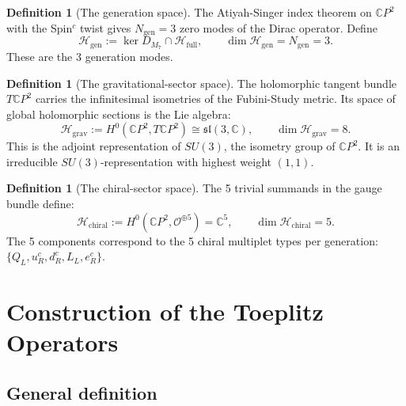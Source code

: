 \documentclass[11pt]{article}
\theoremstyle{definition}
\newtheorem{definition}[theorem]{Definition}
\theoremstyle{remark}
\newcommand{\CP}{\mathbb{C}P}
\begin{document}
\begin{definition}[The generation space]
\label{def:H-gen}
The Atiyah-Singer index theorem on $\CP^2$ with the Spin$^c$ twist
gives $N_{\mathrm{gen}} = 3$ zero modes of the Dirac operator. Define
\begin{equation}
\mathcal{H}_{\mathrm{gen}} := \ker D_{M_7} \cap \mathcal{H}_{\mathrm{full}},
\qquad \dim \mathcal{H}_{\mathrm{gen}} = N_{\mathrm{gen}} = 3.
\end{equation}
These are the 3 generation modes.
\end{definition}

\begin{definition}[The gravitational-sector space]
\label{def:H-grav}
The holomorphic tangent bundle $T\CP^2$ carries the infinitesimal
isometries of the Fubini-Study metric. Its space of global holomorphic
sections is the Lie algebra:
\begin{equation}
\mathcal{H}_{\mathrm{grav}} := H^0(\CP^2, T\CP^2) \cong \mathfrak{sl}(3,\mathbb{C}),
\qquad \dim \mathcal{H}_{\mathrm{grav}} = 8.
\end{equation}
This is the adjoint representation of $SU(3)$, the isometry group of
$\CP^2$. It is an irreducible $SU(3)$-representation with highest weight
$(1,1)$.
\end{definition}

\begin{definition}[The chiral-sector space]
\label{def:H-chiral}
The 5 trivial summands in the gauge bundle define:
\begin{equation}
\mathcal{H}_{\mathrm{chiral}} := H^0(\CP^2, \mathcal{O}^{\oplus 5}) = \mathbb{C}^5,
\qquad \dim \mathcal{H}_{\mathrm{chiral}} = 5.
\end{equation}
The 5 components correspond to the 5 chiral multiplet types per
generation: $\{Q_L, u_R^c, d_R^c, L_L, e_R^c\}$.
\end{definition}


\section{Construction of the Toeplitz Operators}
\label{sec:toeplitz}

\subsection{General definition}
\end{document}
